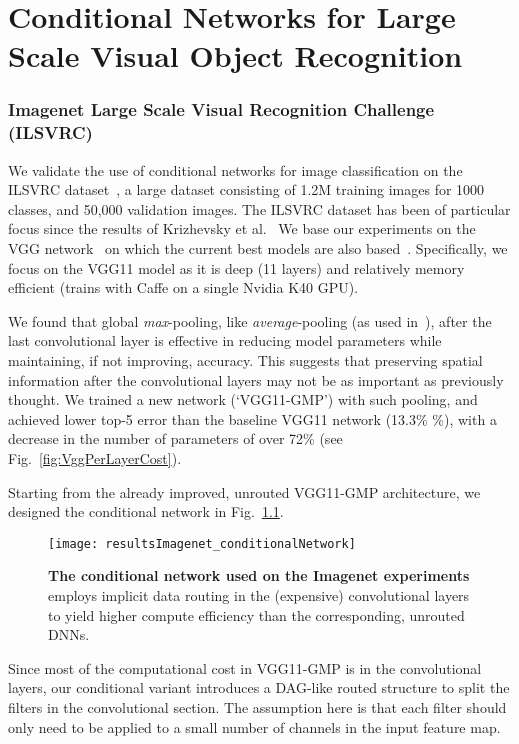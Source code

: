 \documentclass[thesis]{subfiles}
\begin{document}
\chapter{Conditional Networks for Large Scale Visual Object Recognition}
\label{firstyear}

\subsection{Imagenet Large Scale Visual Recognition Challenge (ILSVRC)}
We validate the use of conditional networks for image classification on the ILSVRC dataset~\cite{ILSVRC2015}, a large dataset consisting of 1.2M training images for 1000 classes, and 50,000 validation images. The ILSVRC dataset has been of particular focus since the results of Krizhevsky et al.~\cite{Krizhevsky2012imanet}
We base our experiments on the VGG network~\cite{Simonyan2014verydeep} on which the current best models are also based~\cite{He2015delving}. Specifically, we focus on the VGG11 model as it is deep (11 layers) and relatively memory efficient (trains with Caffe on a single Nvidia K40 GPU).

We found that global {\em max}-pooling, like 
{\em average}-pooling (as used in~\cite{Lin2013NiN,Szegedy2014going}), after the last convolutional layer is effective in reducing model parameters while maintaining, if not improving, accuracy.
This suggests that preserving spatial information after the convolutional layers may not be as important as previously thought. 
We trained a new network (`VGG11-GMP') with such pooling, and achieved lower top-5 error than the baseline VGG11 
network (13.3\% \%), with a decrease in the number of parameters of over 72\% (see Fig.~\ref{fig:VggPerLayerCost}).

Starting from the already improved, unrouted VGG11-GMP architecture,\textbf{} we designed the conditional network in Fig.~\ref{fig:Imagenet_CondNet}.
\begin{figure}[t]
\centerline{
\texttt{[image: resultsImagenet\_conditionalNetwork]}
}
   \caption{{\bf The conditional network used on the Imagenet experiments} employs implicit data routing in the 
   (expensive) convolutional layers to yield higher compute efficiency than the corresponding, unrouted DNNs.}
\label{fig:Imagenet_CondNet}
\end{figure}
%
Since most of the computational cost in VGG11-GMP is in the convolutional layers, our conditional variant 
introduces a DAG-like routed structure to split the filters in the convolutional section.
The assumption here is that each filter should only need to be applied to a small number of channels in the input feature map.
\end{document}
